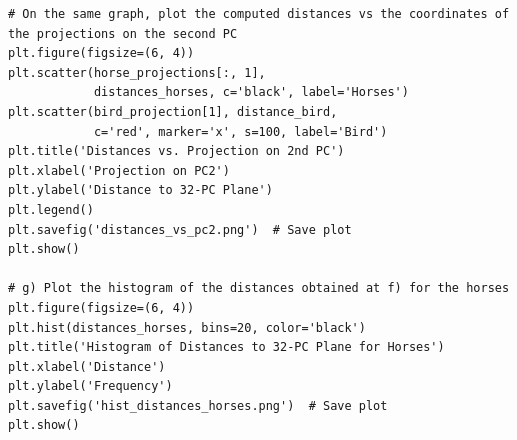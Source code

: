 \documentclass{article}
\begin{document}
\begin{verbatim}
# On the same graph, plot the computed distances vs the coordinates of the projections on the second PC
plt.figure(figsize=(6, 4))
plt.scatter(horse_projections[:, 1],
            distances_horses, c='black', label='Horses')
plt.scatter(bird_projection[1], distance_bird,
            c='red', marker='x', s=100, label='Bird')
plt.title('Distances vs. Projection on 2nd PC')
plt.xlabel('Projection on PC2')
plt.ylabel('Distance to 32-PC Plane')
plt.legend()
plt.savefig('distances_vs_pc2.png')  # Save plot
plt.show()

# g) Plot the histogram of the distances obtained at f) for the horses
plt.figure(figsize=(6, 4))
plt.hist(distances_horses, bins=20, color='black')
plt.title('Histogram of Distances to 32-PC Plane for Horses')
plt.xlabel('Distance')
plt.ylabel('Frequency')
plt.savefig('hist_distances_horses.png')  # Save plot
plt.show()
\end{verbatim}
\end{document}
